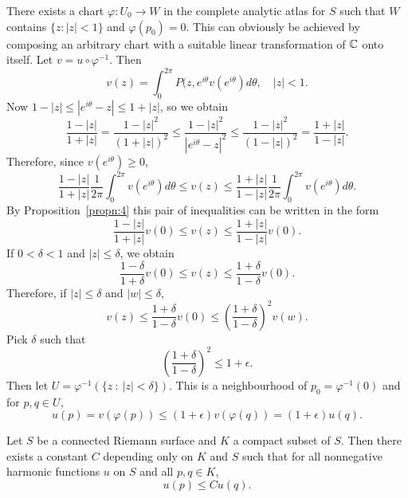 \documentclass[a4paper,11pt]{article}
\begin{document}
\begin{myproof}
  There exists a chart $\varphi : U_0 \to W$ in the complete analytic
  atlas for $S$ such that $W$ contains $\{z : |z| < 1\}$ and
  $\varphi(p_0) = 0$.  This can obviously be achieved by composing an
  arbitrary chart with a suitable linear transformation of ${\mathbb C}$ onto
  itself.  Let $v = u \circ \varphi^{-1}$.  Then
  $$
  v(z) = \int_0^{2\pi} P(z, e^{i\theta} v(e^{i\theta}) d\theta,
  \quad |z| < 1.
  $$
  Now $1 - |z| \le |e^{i\theta} - z| \le 1 + |z|$, so we obtain
  $$
  \frac{1-|z|}{1+|z|}
  = \frac{1-|z|^2}{(1+|z|)^2}
  \le \frac{1-|z|^2}{|e^{i\theta}-z|^2} \le \frac{1-|z|^2}{(1-|z|)^2}
  = \frac{1+|z|}{1-|z|}.
  $$
  Therefore, since $v(e^{i\theta}) \ge 0$,
  $$
  \frac{1-|z|}{1+|z|} \frac{1}{2\pi} \int_0^{2\pi} v(e^{i\theta})
  d\theta
  \le v(z) \le
  \frac{1+|z|}{1-|z|} \frac{1}{2\pi} \int_0^{2\pi} v(e^{i\theta})
  d\theta.
  $$
  By Proposition~\ref{propn:4} this pair of inequalities can be
  written in the form
  $$
  \frac{1-|z|}{1+|z|}v(0) \le v(z) \le \frac{1+|z|}{1-|z|}v(0).
  $$
  If $0 < \delta < 1$ and $|z| \le \delta$, we obtain
  $$
  \frac{1-\delta}{1+\delta} v(0) \le v(z) \le
  \frac{1+\delta}{1-\delta} v(0).
  $$
  Therefore, if $|z| \le \delta$ and $|w| \le \delta$,
  $$
  v(z) \le \frac{1+\delta}{1-\delta}v(0) 
  \le (\frac{1+\delta}{1-\delta})^2 v(w).
  $$
  Pick $\delta$ such that
  $$
  (\frac{1+\delta}{1-\delta})^2 \le 1 + \epsilon.
  $$
  Then let $U = \varphi^{-1}(\{z ~:~ |z| < \delta\})$.  This is a
  neighbourhood of $p_0 = \varphi^{-1}(0)$ and for $p,q \in U$,
  $$
  u(p) = v(\varphi(p)) \le (1+\epsilon) v(\varphi(q))
  = (1 + \epsilon) u(q).
  $$
\end{myproof}

\begin{thm}
  Let $S$ be a connected Riemann surface and $K$ a compact subset of
  $S$.  Then there exists a constant $C$ depending only on $K$ and $S$
  such that for all nonnegative harmonic functions $u$ on $S$ and all
  $p, q\in K$,
  $$
  u(p) \le Cu(q).
  $$
\end{thm}
\end{document}
